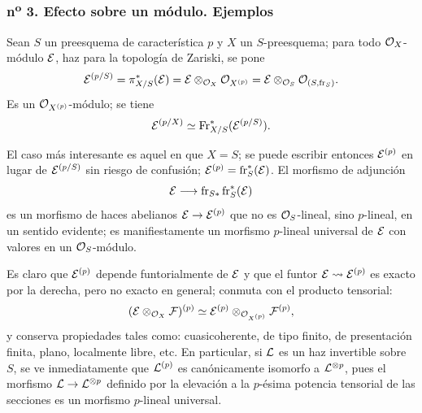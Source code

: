 \subsubsection*{n\textsuperscript{o} 3. Efecto sobre un módulo. Ejemplos}

Sean $S$ un preesquema de característica $p$ y $X$ un $S$-preesquema; para todo $\mathcal{O}_X$-módulo $\mathcal E$, haz para la topología de Zariski, se pone
\[
\mathcal E^{(p/S)}=\pi_{X/S}^*(\mathcal E)=\mathcal E\otimes_{\mathcal{O}_X}\mathcal{O}_{X^{(p)}}
 =\mathcal E\otimes_{\mathcal{O}_S}\mathcal{O}_{(S,\operatorname{fr}_S)}.
\]
Es un $\mathcal{O}_{X^{(p)}}$-módulo; se tiene
\[
\mathcal E^{(p/X)}\simeq \operatorname{Fr}_{X/S}^*(\mathcal E^{(p/S)}).
\]

El caso más interesante es aquel en que $X=S$; se puede escribir entonces $\mathcal E^{(p)}$ en lugar de $\mathcal E^{(p/S)}$ sin riesgo de confusión; $\mathcal E^{(p)}=\operatorname{fr}_S^*(\mathcal E)$. El morfismo de adjunción
\[
\mathcal E\longrightarrow \operatorname{fr}_{S*}\operatorname{fr}_S^*(\mathcal E)
\]
es un morfismo de haces abelianos $\mathcal E\to\mathcal E^{(p)}$ que no es $\mathcal{O}_S$-lineal, sino $p$-lineal, en un sentido evidente; es manifiestamente un morfismo $p$-lineal universal de $\mathcal E$ con valores en un $\mathcal{O}_S$-módulo.

Es claro que $\mathcal E^{(p)}$ depende funtorialmente de $\mathcal E$ y que el funtor $\mathcal E\rightsquigarrow\mathcal E^{(p)}$ es exacto por la derecha, pero no exacto en general; conmuta con el producto tensorial:
\[
(\mathcal E\otimes_{\mathcal{O}_X}\mathcal F)^{(p)}\simeq
\mathcal E^{(p)}\otimes_{\mathcal{O}_{X^{(p)}}}\mathcal F^{(p)},
\]
y conserva propiedades tales como: cuasicoherente, de tipo finito, de presentación finita, plano, localmente libre, etc. En particular, si $\mathcal L$ es un haz invertible sobre $S$, se ve inmediatamente que $\mathcal L^{(p)}$ es canónicamente isomorfo a $\mathcal L^{\otimes p}$, pues el morfismo $\mathcal L\to\mathcal L^{\otimes p}$ definido por la elevación a la $p$-ésima potencia tensorial de las secciones es un morfismo $p$-lineal universal.
